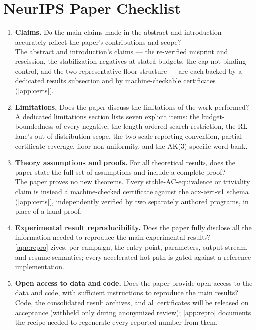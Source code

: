 \section{NeurIPS Paper Checklist}\label{app:checklist}

\begin{enumerate}
  \item \textbf{Claims.} Do the main claims made in the abstract and introduction
    accurately reflect the paper's contributions and scope?\\
    \answerYes{} The abstract and introduction's claims --- the re-verified misprint and
    rescission, the stabilization negatives at stated budgets, the cap-not-binding control,
    and the two-representative floor structure --- are each backed by a dedicated results
    subsection and by machine-checkable certificates (\ref{app:certs}).

  \item \textbf{Limitations.} Does the paper discuss the limitations of the work
    performed?\\
    \answerYes{} A dedicated limitations section lists seven explicit items: the
    budget-boundedness of every negative, the length-ordered-search restriction, the RL
    lane's out-of-distribution scope, the two-scale reporting convention, partial
    certificate coverage, floor non-uniformity, and the AK(3)-specific word bank.

  \item \textbf{Theory assumptions and proofs.} For all theoretical results, does the paper
    state the full set of assumptions and include a complete proof?\\
    \answerYes{} The paper proves no new theorems. Every stable-AC-equivalence or triviality
    claim is instead a machine-checked certificate against the acx-cert-v1 schema
    (\ref{app:certs}), independently verified by two separately authored programs, in place
    of a hand proof.

  \item \textbf{Experimental result reproducibility.} Does the paper fully disclose all the
    information needed to reproduce the main experimental results?\\
    \answerYes{} \ref{app:repro} gives, per campaign, the entry point, parameters, output
    stream, and resume semantics; every accelerated hot path is gated against a reference
    implementation.

  \item \textbf{Open access to data and code.} Does the paper provide open access to the
    data and code, with sufficient instructions to reproduce the main results?\\
    \answerYes{} Code, the consolidated result archives, and all certificates will be
    released on acceptance (withheld only during anonymized review); \ref{app:repro}
    documents the recipe needed to regenerate every reported number from them.


\end{enumerate}

